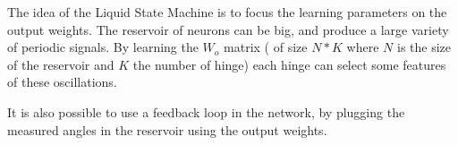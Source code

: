 The idea of the Liquid State Machine is to focus the learning parameters on the output weights. The reservoir of neurons can be big, and produce a large variety of periodic signals. By learning the $W_o$ matrix ( of size $N * K$ where $N$ is the size of the reservoir and $K$ the number of hinge) each hinge can select some features of these oscillations. 

It is also possible to use a feedback loop in the network, by plugging the measured angles in the reservoir using the output weights. 

 



